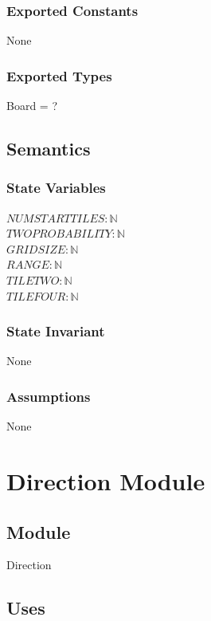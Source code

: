 \documentclass[12pt]{article}
\begin{document}
\subsubsection* {Exported Constants}

None

\subsubsection* {Exported Types}

Board = ?

\subsection* {Semantics}

\subsubsection* {State Variables}

$\mathit{NUMSTARTTILES}: \mathbb{N}$\\
$TWOPROBABILITY: \mathbb{N}$\\
$GRIDSIZE: \mathbb{N}$\\
$RANGE: \mathbb{N}$\\
$TILETWO: \mathbb{N}$\\
$TILEFOUR: \mathbb{N}$

\subsubsection* {State Invariant}

None

\subsubsection* {Assumptions}

None

\newpage

\section* {Direction Module}

\subsection*{Module}

Direction

\subsection* {Uses}
\end{document}
